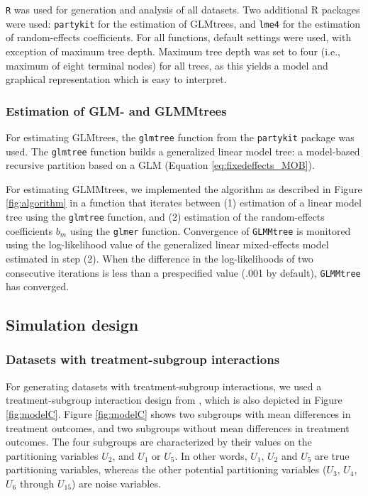 \documentclass[nobf,doc]{apa}
\begin{document}
\verb|R| \cite{R14} was used for generation and analysis of all datasets. Two additional R packages were used: \verb|partykit| \cite{HothyZeil14,ZeilyHoth08} for the estimation of GLMtrees, and \verb|lme4| \cite{BateyMeac12} for the estimation of random-effects coefficients. For all functions, default settings were used, with exception of maximum tree depth. Maximum tree depth was set to four (i.e., maximum of eight terminal nodes) for all trees, as this yields a model and graphical representation which is easy to interpret.  


\subsubsection{Estimation of GLM- and GLMMtrees}

For estimating GLMtrees, the \verb|glmtree| function from the \verb|partykit| package was used. The \verb|glmtree| function builds a generalized linear model tree: a model-based recursive partition based on a GLM (Equation \ref{eq:fixedeffects_MOB}).  

For estimating GLMMtrees, we implemented the algorithm as described in Figure \ref{fig:algorithm} in a function that iterates between (1) estimation of a linear model tree using the \verb|glmtree| function, and (2) estimation of the random-effects coefficients $b_m$ using the \verb|glmer| function. Convergence of \verb|GLMMtree| is monitored using the log-likelihood value of the generalized linear mixed-effects model estimated in step (2). When the difference in the log-likelihoods of two consecutive iterations is less than a prespecified value (.001 by default), \verb|GLMMtree| has converged.



\subsection{Simulation design}

\subsubsection{Datasets with treatment-subgroup interactions}
For generating datasets with treatment-subgroup interactions, we used a treatment-subgroup interaction design from , which is also depicted in Figure \ref{fig:modelC}. Figure \ref{fig:modelC} shows two subgroups with mean differences in treatment outcomes, and two subgroups without mean differences in treatment outcomes. The four subgroups are characterized by their values on the partitioning variables $U_2$, and $U_1$ or $U_5$. In other words, $U_1$, $U_2$ and $U_5$ are true partitioning variables, whereas the other potential partitioning variables ($U_3$, $U_4$, $U_6$ through $U_{15}$) are noise variables.
\end{document}
